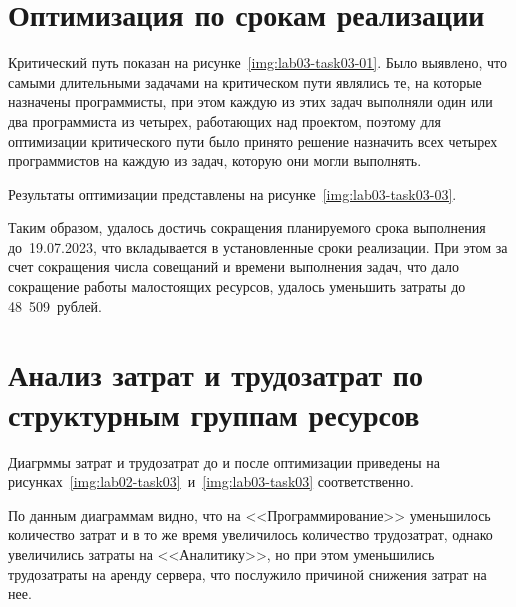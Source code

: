 \vspace{-0.5cm}
\section{Оптимизация по срокам реализации}

Критический путь показан на рисунке~\ref{img:lab03-task03-01}.
Было выявлено, что самыми длительными задачами на критическом пути являлись те,
на которые назначены программисты, при этом каждую из этих задач выполняли один
или два программиста из четырех, работающих над проектом, поэтому для
оптимизации критического пути было принято решение назначить всех четырех
программистов на каждую из задач, которую они могли выполнять.


Результаты оптимизации представлены на рисунке~\ref{img:lab03-task03-03}.


Таким образом, удалось достичь сокращения планируемого срока выполнения
до~19.07.2023, что вкладывается в установленные сроки реализации. При этом за
счет сокращения числа совещаний и времени выполнения задач, что дало сокращение
работы малостоящих ресурсов, удалось уменьшить затраты до 48~509~рублей.

\section{Анализ затрат и трудозатрат по структурным группам \mbox{ресурсов}}

Диагрммы затрат и трудозатрат до и после оптимизации приведены на
рисунках~\ref{img:lab02-task03}~и~\ref{img:lab03-task03} соответственно.



 По данным диаграммам видно, что на <<Программирование>> уменьшилось количество
 затрат и в то же время увеличилось количество трудозатрат, однако увеличились
 затраты на <<Аналитику>>, но при этом уменьшились трудозатраты на аренду
 сервера, что послужило причиной снижения затрат на нее.


